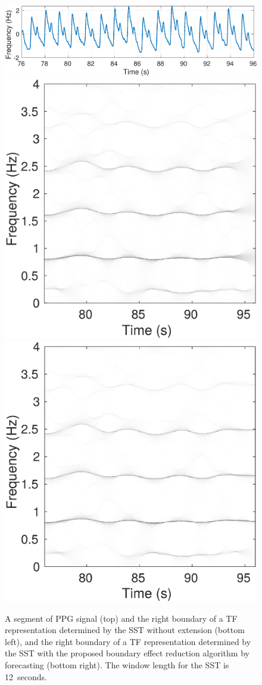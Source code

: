 \documentclass[journal]{IEEEtran}
\begin{document}
\begin{figure}
\centering
\includegraphics[width=.48\textwidth]{PPGsig.eps}
\includegraphics[width=.24\textwidth]{zoomSSTintro.eps}
\includegraphics[width=.24\textwidth]{zoomSSTBoundEffRed.eps}
\caption{A segment of PPG signal (top) and the right boundary of a TF representation determined by the SST without extension (bottom left), and the right boundary of a TF representation determined by the SST with the proposed boundary effect reduction algorithm by forecasting (bottom right). The window length for the SST is 12~seconds.}
\label{fig:ex.intro}
\end{figure}
\end{document}
